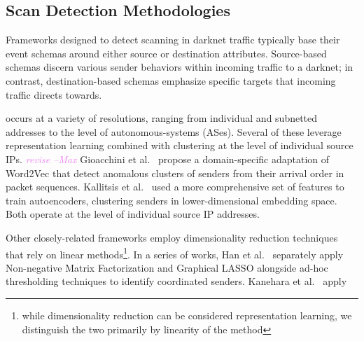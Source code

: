 \documentclass[manuscript,nonacm]{acmart}
\newcommand{\maxnote}[1]{\textit{\textcolor{violet}{#1 --Max}}}
\begin{document}

\subsection{Scan Detection Methodologies}

Frameworks designed to detect scanning in darknet traffic typically base their event schemas around either source or destination attributes.
Source-based schemas discern various sender behaviors within incoming traffic to a darknet; in contrast, destination-based schemas emphasize specific targets that incoming traffic directs towards.
\vspace{0.25em}



 occurs at a variety of resolutions, ranging from individual and subnetted addresses to the level of autonomous-systems (ASes).
Several of these leverage representation learning combined with clustering at the level of individual source IPs. \maxnote{revise}
Gioacchini et al.~\cite{@@} propose a domain-specific adaptation of Word2Vec that detect anomalous clusters of senders from their arrival order in packet sequences. 
Kallitsis et al.~\cite{@@} used a more comprehensive set of features to train autoencoders, clustering senders in lower-dimensional embedding space.
Both operate at the level of individual source IP addresses. 

Other closely-related frameworks employ dimensionality reduction techniques that rely on linear methods\footnote{while dimensionality reduction can be considered representation learning, we distinguish the two primarily by linearity of the method}.
In a series of works, Han et al.~\cite{@@} separately apply Non-negative Matrix Factorization and Graphical LASSO alongside ad-hoc thresholding techniques to identify coordinated senders.
Kanehara et al.~\cite{@@} apply 
\end{document}
